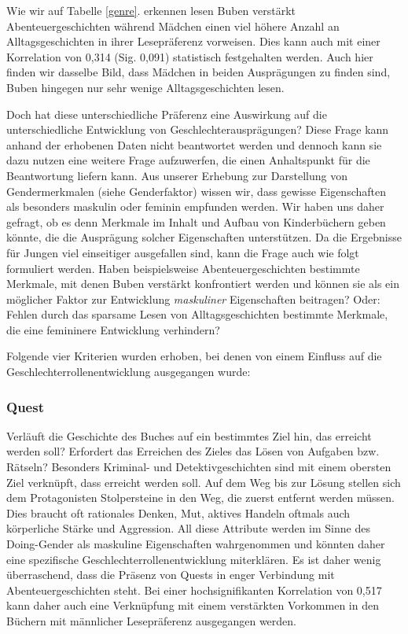 Wie wir auf Tabelle \ref{genre}. erkennen lesen Buben verstärkt
Abenteuergeschichten während Mädchen einen viel höhere Anzahl an
Alltagsgeschichten in ihrer Lesepräferenz vorweisen. Dies kann auch mit
einer Korrelation von 0,314 (Sig. 0,091) statistisch festgehalten
werden. Auch hier finden wir dasselbe Bild, dass Mädchen in beiden
Ausprägungen zu finden sind, Buben hingegen nur sehr wenige
Alltagsgeschichten lesen.

Doch hat diese unterschiedliche Präferenz eine Auswirkung auf die
unterschiedliche Entwicklung von Geschlechterausprägungen? Diese Frage
kann anhand der erhobenen Daten nicht beantwortet werden und dennoch
kann sie dazu nutzen eine weitere Frage aufzuwerfen, die einen
Anhaltspunkt für die Beantwortung liefern kann. Aus unserer Erhebung zur
Darstellung von Gendermerkmalen (siehe Genderfaktor) wissen wir, dass
gewisse Eigenschaften als besonders maskulin oder feminin empfunden
werden. Wir haben uns daher gefragt, ob es denn Merkmale im Inhalt und
Aufbau von Kinderbüchern geben könnte, die die Ausprägung solcher
Eigenschaften unterstützen. Da die Ergebnisse für Jungen viel
einseitiger ausgefallen sind, kann die Frage auch wie folgt formuliert
werden. Haben beispielsweise Abenteuergeschichten bestimmte Merkmale,
mit denen Buben verstärkt konfrontiert werden und können sie als ein
möglicher Faktor zur Entwicklung \emph{maskuliner} Eigenschaften
beitragen? Oder: Fehlen durch das sparsame Lesen von Alltagsgeschichten
bestimmte Merkmale, die eine femininere Entwicklung verhindern?

Folgende vier Kriterien wurden erhoben, bei denen von einem Einfluss auf
die Geschlechterrollenentwicklung ausgegangen wurde:

\subsubsection{Quest}

Verläuft die Geschichte des Buches auf ein bestimmtes Ziel hin, das
erreicht werden soll? Erfordert das Erreichen des Zieles das Lösen von
Aufgaben bzw. Rätseln? Besonders Kriminal- und Detektivgeschichten sind
mit einem obersten Ziel verknüpft, dass erreicht werden soll. Auf dem
Weg bis zur Lösung stellen sich dem Protagonisten Stolpersteine in den
Weg, die zuerst entfernt werden müssen. Dies braucht oft rationales
Denken, Mut, aktives Handeln oftmals auch körperliche Stärke und
Aggression. All diese Attribute werden im Sinne des Doing-Gender als
maskuline Eigenschaften wahrgenommen und könnten daher eine spezifische
Geschlechterrollenentwicklung miterklären. Es ist daher wenig
überraschend, dass die Präsenz von Quests in enger Verbindung mit
Abenteuergeschichten steht. Bei einer hochsignifikanten Korrelation von
0,517 kann daher auch eine Verknüpfung mit einem verstärkten Vorkommen
in den Büchern mit männlicher Lesepräferenz ausgegangen werden.

